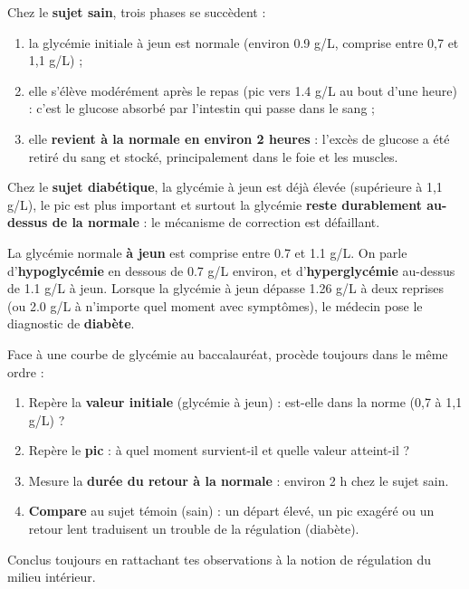 \documentclass[11pt]{article}
\begin{document}
Chez le \textbf{sujet sain}, trois phases se succèdent :
\begin{enumerate}
    \item la glycémie initiale à jeun est normale (environ \num{0,9} g/L, comprise entre 0,7 et 1,1 g/L) ;
    \item elle s'élève modérément après le repas (pic vers \num{1,4} g/L au bout d'une heure) : c'est le glucose absorbé par l'intestin qui passe dans le sang ;
    \item elle \textbf{revient à la normale en environ 2 heures} : l'excès de glucose a été retiré du sang et stocké, principalement dans le foie et les muscles.
\end{enumerate}

Chez le \textbf{sujet diabétique}, la glycémie à jeun est déjà élevée (supérieure à 1,1 g/L), le pic est plus important et surtout la glycémie \textbf{reste durablement au-dessus de la normale} : le mécanisme de correction est défaillant.

\begin{propriete}
La glycémie normale \textbf{à jeun} est comprise entre \num{0,7} et \num{1,1} g/L. On parle d'\textbf{hypoglycémie} en dessous de \num{0,7} g/L environ, et d'\textbf{hyperglycémie} au-dessus de \num{1,1} g/L à jeun. Lorsque la glycémie à jeun dépasse \num{1,26} g/L à deux reprises (ou \num{2,0} g/L à n'importe quel moment avec symptômes), le médecin pose le diagnostic de \textbf{diabète}.
\end{propriete}

\begin{methode}
Face à une courbe de glycémie au baccalauréat, procède toujours dans le même ordre :
\begin{enumerate}
    \item Repère la \textbf{valeur initiale} (glycémie à jeun) : est-elle dans la norme (0,7 à 1,1 g/L) ?
    \item Repère le \textbf{pic} : à quel moment survient-il et quelle valeur atteint-il ?
    \item Mesure la \textbf{durée du retour à la normale} : environ 2 h chez le sujet sain.
    \item \textbf{Compare} au sujet témoin (sain) : un départ élevé, un pic exagéré ou un retour lent traduisent un trouble de la régulation (diabète).
\end{enumerate}
Conclus toujours en rattachant tes observations à la notion de régulation du milieu intérieur.
\end{methode}
\end{document}
